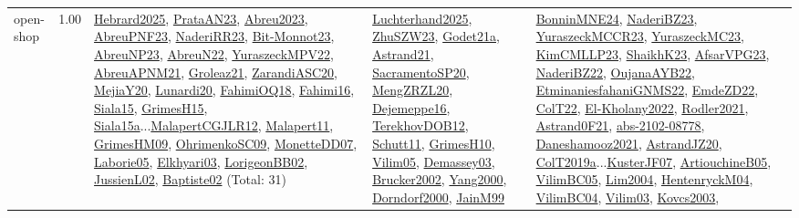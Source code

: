 {\begin{longtable}{p{3cm}r>{\raggedright\arraybackslash}p{6cm}>{\raggedright\arraybackslash}p{6cm}>{\raggedright\arraybackslash}p{8cm}}
\index{open-shop}\index{Concepts!open-shop}open-shop &  1.00 & \hyperref[detail:Hebrard2025]{Hebrard2025}, \hyperref[detail:PrataAN23]{PrataAN23}, \hyperref[detail:Abreu2023]{Abreu2023}, \hyperref[detail:AbreuPNF23]{AbreuPNF23}, \hyperref[detail:NaderiRR23]{NaderiRR23}, \hyperref[detail:Bit-Monnot23]{Bit-Monnot23}, \hyperref[detail:AbreuNP23]{AbreuNP23}, \hyperref[detail:AbreuN22]{AbreuN22}, \hyperref[detail:YuraszeckMPV22]{YuraszeckMPV22}, \hyperref[detail:AbreuAPNM21]{AbreuAPNM21}, \hyperref[detail:Groleaz21]{Groleaz21}, \hyperref[detail:ZarandiASC20]{ZarandiASC20}, \hyperref[detail:MejiaY20]{MejiaY20}, \hyperref[detail:Lunardi20]{Lunardi20}, \hyperref[detail:FahimiOQ18]{FahimiOQ18}, \hyperref[detail:Fahimi16]{Fahimi16}, \hyperref[detail:Siala15]{Siala15}, \hyperref[detail:GrimesH15]{GrimesH15}, \hyperref[detail:Siala15a]{Siala15a}...\hyperref[detail:MalapertCGJLR12]{MalapertCGJLR12}, \hyperref[detail:Malapert11]{Malapert11}, \hyperref[detail:GrimesHM09]{GrimesHM09}, \hyperref[detail:OhrimenkoSC09]{OhrimenkoSC09}, \hyperref[detail:MonetteDD07]{MonetteDD07}, \hyperref[detail:Laborie05]{Laborie05}, \hyperref[detail:Elkhyari03]{Elkhyari03}, \hyperref[detail:LorigeonBB02]{LorigeonBB02}, \hyperref[detail:JussienL02]{JussienL02}, \hyperref[detail:Baptiste02]{Baptiste02} (Total: 31) & \hyperref[detail:Luchterhand2025]{Luchterhand2025}, \hyperref[detail:ZhuSZW23]{ZhuSZW23}, \hyperref[detail:Godet21a]{Godet21a}, \hyperref[detail:Astrand21]{Astrand21}, \hyperref[detail:SacramentoSP20]{SacramentoSP20}, \hyperref[detail:MengZRZL20]{MengZRZL20}, \hyperref[detail:Dejemeppe16]{Dejemeppe16}, \hyperref[detail:TerekhovDOB12]{TerekhovDOB12}, \hyperref[detail:Schutt11]{Schutt11}, \hyperref[detail:GrimesH10]{GrimesH10}, \hyperref[detail:Vilim05]{Vilim05}, \hyperref[detail:Demassey03]{Demassey03}, \hyperref[detail:Brucker2002]{Brucker2002}, \hyperref[detail:Yang2000]{Yang2000}, \hyperref[detail:Dorndorf2000]{Dorndorf2000}, \hyperref[detail:JainM99]{JainM99} & \hyperref[detail:BonninMNE24]{BonninMNE24}, \hyperref[detail:NaderiBZ23]{NaderiBZ23}, \hyperref[detail:YuraszeckMCCR23]{YuraszeckMCCR23}, \hyperref[detail:YuraszeckMC23]{YuraszeckMC23}, \hyperref[detail:KimCMLLP23]{KimCMLLP23}, \hyperref[detail:ShaikhK23]{ShaikhK23}, \hyperref[detail:AfsarVPG23]{AfsarVPG23}, \hyperref[detail:NaderiBZ22]{NaderiBZ22}, \hyperref[detail:OujanaAYB22]{OujanaAYB22}, \hyperref[detail:EtminaniesfahaniGNMS22]{EtminaniesfahaniGNMS22}, \hyperref[detail:EmdeZD22]{EmdeZD22}, \hyperref[detail:ColT22]{ColT22}, \hyperref[detail:El-Kholany2022]{El-Kholany2022}, \hyperref[detail:Rodler2021]{Rodler2021}, \hyperref[detail:Astrand0F21]{Astrand0F21}, \hyperref[detail:abs-2102-08778]{abs-2102-08778}, \hyperref[detail:Daneshamooz2021]{Daneshamooz2021}, \hyperref[detail:AstrandJZ20]{AstrandJZ20}, \hyperref[detail:ColT2019a]{ColT2019a}...\hyperref[detail:KusterJF07]{KusterJF07}, \hyperref[detail:ArtiouchineB05]{ArtiouchineB05}, \hyperref[detail:VilimBC05]{VilimBC05}, \hyperref[detail:Lim2004]{Lim2004}, \hyperref[detail:HentenryckM04]{HentenryckM04}, \hyperref[detail:VilimBC04]{VilimBC04}, \hyperref[detail:Vilim03]{Vilim03}, \hyperref[detail:Kovcs2003]{Kovcs2003}, 
\end{longtable}}
